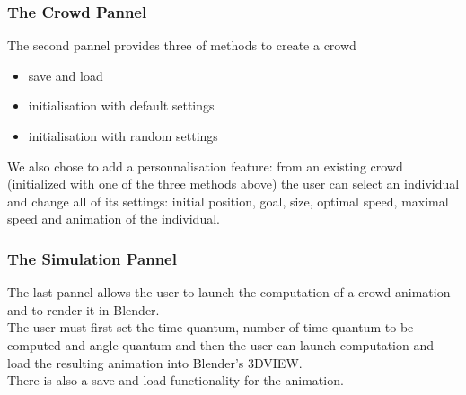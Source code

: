 \subsubsection{The Crowd Pannel}
The second pannel provides three of methods to create a crowd 
\begin{itemize}
\item save and load
\item initialisation with default settings
\item initialisation with random settings
\end{itemize}

We also chose to add a personnalisation feature: from an existing crowd (initialized with one of the three methods above) the user can select an individual and change all of its settings: initial position, goal, size, optimal speed, maximal speed and animation of the individual.


\subsubsection{The Simulation Pannel}
The last pannel allows the user to launch the computation of a crowd animation and to render it in Blender.\\
The user must first set the time quantum, number of time quantum to be computed and angle quantum and then the user can launch computation and load the resulting animation into Blender's 3DVIEW.\\
There is also a save and load functionality for the animation.


